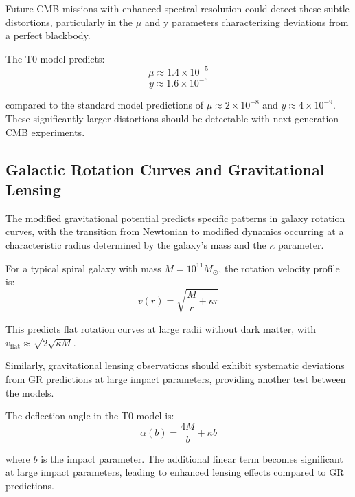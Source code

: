 \documentclass[12pt,a4paper]{article} %
\begin{document}
	Future CMB missions with enhanced spectral resolution
	could detect these subtle distortions,
	particularly in the $\mu$ and y parameters
	characterizing deviations from a perfect blackbody.
	
	The T0 model predicts:
	\begin{equation}
		\mu \approx 1.4 \times 10^{-5}
		\label{eq:distortion_parameters_part1}
	\end{equation}
	\begin{equation}
		y \approx 1.6 \times 10^{-6}
		\label{eq:distortion_parameters_part2}
	\end{equation}
	
	compared to the standard model predictions of
	$\mu \approx 2 \times 10^{-8}$ and $y \approx 4 \times 10^{-9}$. 
	These significantly larger distortions
	should be detectable with next-generation CMB experiments.
	
	\subsection{Galactic Rotation Curves and Gravitational Lensing}
	\label{subsec:rotation_lensing}
	
	The modified gravitational potential
	predicts specific patterns in galaxy rotation curves,
	with the transition from Newtonian to modified dynamics
	occurring at a characteristic radius
	determined by the galaxy's mass and the $\kappa$ parameter.
	
	For a typical spiral galaxy with mass $M = 10^{11} M_{\odot}$,
	the rotation velocity profile is:
	\begin{equation}
		v(r) = \sqrt{\frac{M}{r} + \kappa r}
		\label{eq:velocity_profile}
	\end{equation}
	
	This predicts flat rotation curves at large radii without dark matter,
	with $v_{\text{flat}} \approx \sqrt{2\sqrt{\kappa M}}$.
	
	Similarly, gravitational lensing observations
	should exhibit systematic deviations from GR predictions
	at large impact parameters,
	providing another test between the models.
	
	The deflection angle in the T0 model is:
	\begin{equation}
		\alpha(b) = \frac{4M}{b} + \kappa b
		\label{eq:deflection_angle}
	\end{equation}
	
	where $b$ is the impact parameter. 
	The additional linear term becomes significant at large impact parameters,
	leading to enhanced lensing effects compared to GR predictions.
	
\end{document}
